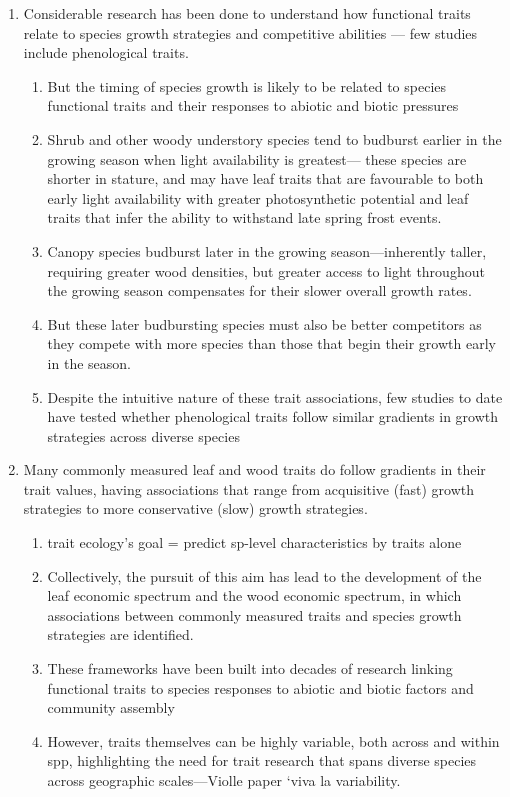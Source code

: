 \documentclass{article}
\begin{document}
\begin{enumerate}
\item Considerable research has been done to understand how functional traits relate to species growth strategies and competitive abilities — few studies include phenological traits.
\begin{enumerate}
\item But the timing of species growth is likely to be related to species functional traits and their responses to abiotic and biotic pressures
\item Shrub and other woody understory species tend to budburst earlier in the growing season when light availability is greatest--- these species are shorter in stature, and may have leaf traits that are favourable to both early light availability with greater photosynthetic potential and leaf traits that infer the ability to withstand late spring frost events.
\item Canopy species budburst later in the growing season---inherently taller, requiring greater wood densities, but greater access to light  throughout the growing season compensates for their slower overall growth rates.
\item But these later budbursting species must also be better competitors as they compete with more species than those that begin their growth early in the season.
\item Despite the intuitive nature of these trait associations, few studies to date have tested whether phenological traits follow similar gradients in growth strategies across diverse species
\end{enumerate}

 \item Many commonly measured leaf and wood traits do follow gradients in their trait values, having associations that range from acquisitive (fast) growth strategies to more conservative (slow) growth strategies.
\begin{enumerate}
\item trait ecology’s goal = predict sp-level characteristics by traits alone %
\item Collectively, the pursuit of this aim has lead to the development of the leaf economic spectrum and the wood economic spectrum, in which associations between commonly measured  traits and species growth strategies are identified. 
\item These frameworks have been built into decades of research linking functional traits to species responses to abiotic and biotic factors and community assembly
\item However, traits themselves can be highly variable, both across and within spp, highlighting the need for trait research that spans diverse species across geographic scales---Violle paper ‘viva la variability. 
\end{enumerate}


\end{enumerate}
\end{document}

